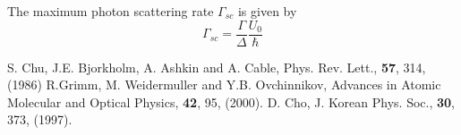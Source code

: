 \documentclass[amssymb,amsmath,aps,prl,twocolumn]{revtex4}
\begin{document}
The maximum photon scattering rate $\Gamma_{sc}$ is given by
\begin{equation}
\Gamma_{sc}=\frac{\Gamma}{\Delta}\frac{U_{0}}{\hbar}
\end{equation}




\begin{thebibliography}{99}
S. Chu, J.E. Bjorkholm, A. Ashkin and A. Cable, Phys. Rev. Lett., {\bf 57}, 314, (1986)
 R.Grimm, M. Weidermuller and Y.B. Ovchinnikov,
Advances in Atomic Molecular and Optical Physics, {\bf 42}, 95, (2000).
 D. Cho, J. Korean Phys. Soc., {\bf 30}, 373, (1997).
\end{thebibliography}
\end{document}
